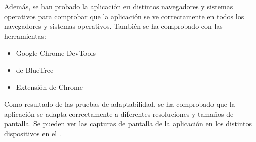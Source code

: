 Además, se han probado la aplicación en distintos navegadores y sistemas operativos para comprobar que la aplicación se ve correctamente en todos los navegadores y sistemas operativos.
También se ha comprobado con las herramientas:
\begin{itemize}
			\item Google Chrome DevTools
			\item {} de BlueTree
			\item Extensión de Chrome 
\end{itemize}

Como resultado de las pruebas de adaptabilidad, se ha comprobado que la aplicación se adapta correctamente a diferentes resoluciones y tamaños de pantalla.
Se pueden ver las capturas de pantalla de la aplicación en los distintos dispositivos en el
.